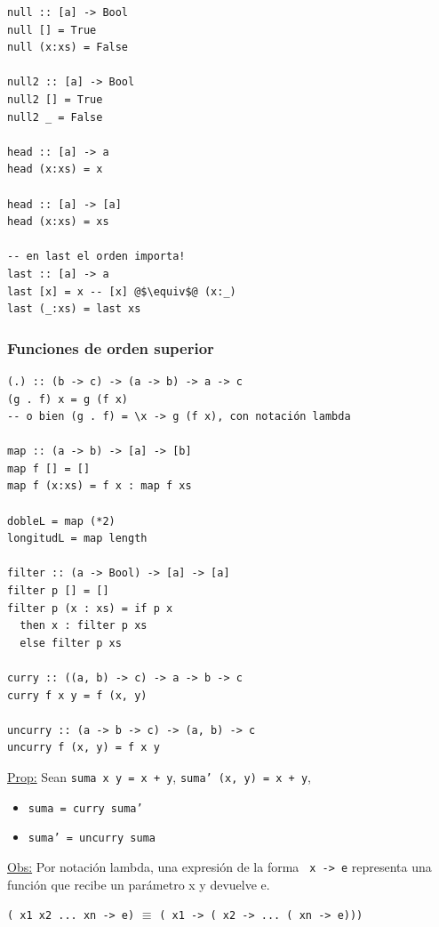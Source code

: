 \documentclass[12pt]{extarticle}
\def\propiedad{\underline{Prop:} }
\def\observacion{\underline{Obs:} }
\newcommand\hsline[1]{\texttt{#1}}
\begin{document}
\begin{verbatim}
null :: [a] -> Bool
null [] = True
null (x:xs) = False

null2 :: [a] -> Bool
null2 [] = True
null2 _ = False

head :: [a] -> a
head (x:xs) = x

head :: [a] -> [a]
head (x:xs) = xs

-- en last el orden importa!
last :: [a] -> a
last [x] = x -- [x] @$\equiv$@ (x:_)
last (_:xs) = last xs 
\end{verbatim}

\subsubsection{Funciones de orden superior}
\begin{verbatim}
(.) :: (b -> c) -> (a -> b) -> a -> c
(g . f) x = g (f x)
-- o bien (g . f) = \x -> g (f x), con notación lambda

map :: (a -> b) -> [a] -> [b]
map f [] = []
map f (x:xs) = f x : map f xs

dobleL = map (*2)
longitudL = map length

filter :: (a -> Bool) -> [a] -> [a]
filter p [] = []
filter p (x : xs) = if p x 
  then x : filter p xs 
  else filter p xs

curry :: ((a, b) -> c) -> a -> b -> c
curry f x y = f (x, y)

uncurry :: (a -> b -> c) -> (a, b) -> c
uncurry f (x, y) = f x y
\end{verbatim}

\propiedad Sean \hsline{suma x y = x + y}, \hsline{suma' (x, y) = x + y},
\begin{itemize}
\vspace{-0.2cm}
\setlength\itemsep{-0.4em}
  \item \hsline{suma = curry suma'}
  \item \hsline{suma' = uncurry suma}
\end{itemize}

\observacion Por notación lambda, una expresión de la forma 
\texttt{\ x -> e}
representa una función que recibe un parámetro x y devuelve e. \\
\vspace{-0.5cm}
\begin{center}
\texttt{(\ x1 x2 ... xn -> e)} $\equiv$ \texttt{(\ x1 -> (\ x2 -> ... (\ xn -> e)))}
\end{center}
\end{document}
